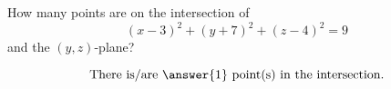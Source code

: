 \documentclass{ximera}
\author{Bart Snapp}
\begin{document}
\begin{exercise}
  How many points are on the intersection of
  \[
  (x-3)^2 + (y+7)^2 + (z-4)^2 = 9
  \]
  and the $(y,z)$-plane?
  \begin{prompt}
  \[
  \text{There is/are $\answer{1}$ point(s) in the intersection.}
  \]
  \end{prompt}
\end{exercise}
\end{document}
